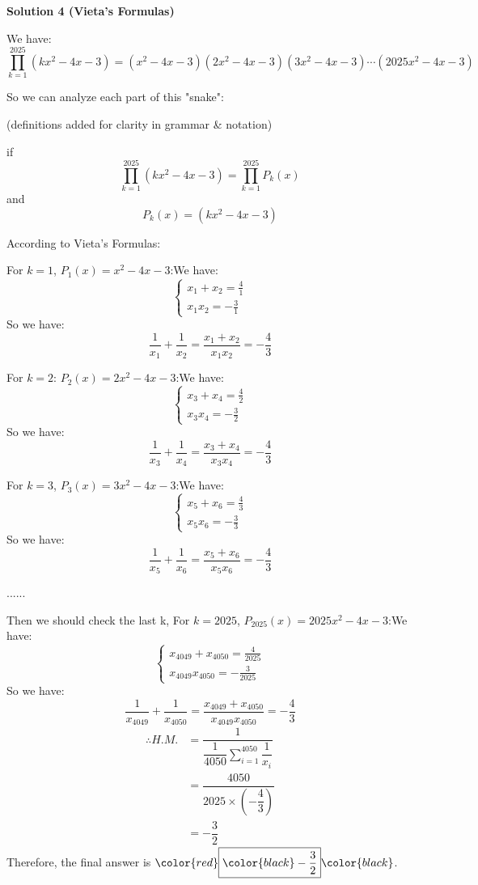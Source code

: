 \begin{enumerate}
 


 



\textbf{Solution 4 (Vieta's Formulas)}

We have: 
 \[\prod_{k = 1}^{2025} (kx^{2} - 4x - 3) = (x^{2} - 4x - 3)(2x^{2} - 4x - 3)(3x^{2} - 4x - 3) \cdots (2025x^{2} - 4x - 3)\]

 So we can analyze each part of this "snake":

 (definitions added for clarity in grammar & notation)

 if 
 \[\prod_{k = 1}^{2025} (kx^{2} - 4x - 3)=\prod_{k = 1}^{2025} P_k(x)\]and
 \[P_k(x)= (kx^{2} - 4x - 3)\]

 According to Vieta's Formulas:

 For $k=1$, $P_1(x)=x^{2} - 4x - 3$:We have:
 \[\begin{cases}  x_1+x_2=\frac{4}{1}\\ x_1x_2=-\frac{3}{1} \end{cases}\]So we have: 
 \[\dfrac{1}{x_1}+\dfrac{1}{x_2}=\dfrac{x_1+x_2}{x_1x_2}=-\dfrac{4}{3}\]

 For $k=2$: $P_2(x) = 2x^{2} - 4x - 3$:We have:
 \[\begin{cases}  x_3+x_4=\frac{4}{2}\\ x_3x_4=-\frac{3}{2} \end{cases}\]So we have: 
 \[\dfrac{1}{x_3}+\dfrac{1}{x_4}=\dfrac{x_3+x_4}{x_3x_4}=-\dfrac{4}{3}\]

 For $k=3$, $P_3(x)=3x^{2} - 4x - 3$:We have:
 \[\begin{cases}  x_5+x_6=\frac{4}{3}\\ x_5x_6=-\frac{3}{3} \end{cases}\]So we have: 
 \[\dfrac{1}{x_5}+\dfrac{1}{x_6}=\dfrac{x_5+x_6}{x_5x_6}=-\dfrac{4}{3}\]

 ......

 Then we should check the last k, For $k=2025$, $P_{2025}(x) = 2025x^{2} - 4x - 3$:We have:
 \[\begin{cases}  x_{4049}+x_{4050}=\frac{4}{2025}\\ x_{4049}x_{4050}=-\frac{3}{2025} \end{cases}\]So we have: 
 \[\dfrac{1}{x_{4049}}+\dfrac{1}{x_{4050}}=\dfrac{x_{4049}+x_{4050}}{x_{4049}x_{4050}}=-\dfrac{4}{3}\]
 \begin{align*} \therefore H.M.&=\dfrac{1}{\dfrac{1}{4050}\sum_{i=1}^{4050}\dfrac{1}{x_i}}\\ &=\dfrac{4050}{2025\times\left(-\dfrac{4}{3}\right)}\\ &=-\dfrac{3}{2} \end{align*}
Therefore, the final answer is $\color{red}\boxed{\color{black}-\dfrac{3}{2}}\color{black}$.


\end{enumerate}
